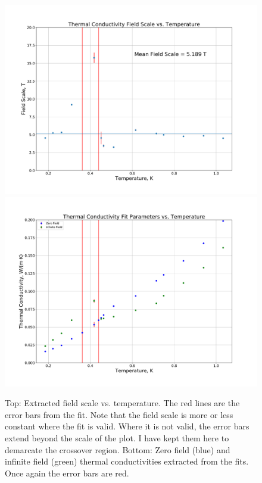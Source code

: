 \documentclass{thesis-umich}
\begin{document}
\begin{figure}
	\centering
	\caption[SCBO Fitting Parameters vs. Temperature]{Top: Extracted field scale vs. temperature. The red lines are the error bars from the fit. Note that the field scale is more or less constant where the fit is valid. Where it is not valid, the error bars extend beyond the scale of the plot. I have kept them here to demarcate the crossover region. Bottom: Zero field (blue) and infinite field (green) thermal conductivities extracted from the fits. Once again the error bars are red.}
	\label{fig:SCBO_fit_params}
	\includegraphics[width=0.9\columnwidth,trim={1cm 1cm 1cm 1cm},clip]{figures/SCBO_field_scale.pdf}
	\includegraphics[width=0.9\columnwidth,trim={1cm 1cm 1cm 1cm},clip]{figures/SCBO_tcond_params.pdf}
\end{figure}
\end{document}

